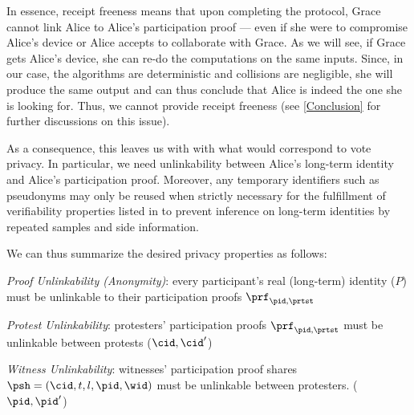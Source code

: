 In essence, receipt freeness means that upon completing the protocol, Grace cannot link Alice to Alice's participation proof --- even if she were to compromise Alice's device or Alice accepts to collaborate with Grace.
As we will see, if Grace gets Alice's device, she can re-do the computations on the same inputs.
Since, in our case, the algorithms are deterministic and collisions are negligible, she will produce the same output and can thus conclude that Alice is indeed the one she is looking for.
Thus, we cannot provide receipt freeness (see \cref{Conclusion} for further discussions on this issue).

As a consequence, this leaves us with with what would correspond to vote privacy.
In particular, we need unlinkability between Alice's long-term identity and Alice's participation proof.
Moreover, any temporary identifiers such as pseudonyms may only be
reused when strictly necessary for the fulfillment of verifiability
properties listed in \label{verifiability-properties} to prevent
inference on long-term identities by repeated samples and side information.

We can thus summarize the desired privacy properties as follows:
\begin{requirements}[P]
\item\label{ProofUnlink} \emph{Proof Unlinkability (Anonymity)}: every
  participant's real (long-term) 
  identity (\(P\)) must be unlinkable to their participation proofs \(\prf_{\pid, \prtst}\)
\item\label{ProtestUnlink} \emph{Protest Unlinkability}: protesters'
  participation proofs \(\prf_{\pid, \prtst}\) must be 
  unlinkable between protests (\(\cid, \cid' \))
\item\label{WitnessUnlink}\emph{Witness Unlinkability}:  witnesses'
  participation proof shares \(\psh = (\cid, t, l, \pid,\wid)\) 
must be unlinkable between 
  protesters. (\(\pid, \pid' \))
\end{requirements}


